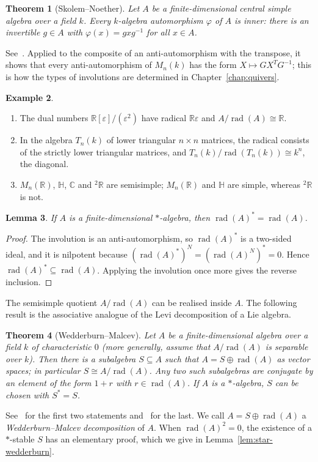 \documentclass[12pt, a4paper]{report}
\theoremstyle{plain}
\newtheorem{theorem}{Theorem}[chapter]
\newtheorem{lemma}[theorem]{Lemma}
\theoremstyle{definition}
\newtheorem{example}[theorem]{Example}
\theoremstyle{remark}
\theoremstyle{plain}
\newcommand{\rad}[0]{\operatorname{rad}} %
\newcommand{\RR}{\mathbb{R}}
\newcommand{\CC}{\mathbb{C}}
\newcommand{\HH}{\mathbb{H}}
\newcommand{\twoR}{{}^{2}\mathbb{R}}
\begin{document}
\begin{theorem}[Skolem--Noether]\label{thm:skolem-noether}
Let $A$ be a finite-dimensional central simple algebra over a field $k$. Every $k$-algebra automorphism $\varphi$ of $A$ is inner: there is an invertible $g\in A$ with $\varphi(x)=gxg^{-1}$ for all $x\in A$.
\end{theorem}
See~\cite{Jacobson1989,KMRT1998}. Applied to the composite of an anti-automorphism with the transpose, it shows that every anti-automorphism of $M_n(k)$ has the form $X\mapsto GX^TG^{-1}$; this is how the types of involutions are determined in Chapter~\ref{chap:quivers}.

\begin{example}\label{ex:radicals}
\begin{enumerate}
  \item The dual numbers $\RR[\varepsilon]/(\varepsilon^2)$ have radical $\RR\varepsilon$ and $A/\rad(A)\cong\RR$.
  \item In the algebra $T_n(k)$ of lower triangular $n\times n$ matrices, the radical consists of the strictly lower triangular matrices, and $T_n(k)/\rad(T_n(k))\cong k^n$, the diagonal.
  \item $M_n(\RR)$, $\HH$, $\CC$ and $\twoR$ are semisimple; $M_n(\RR)$ and $\HH$ are simple, whereas $\twoR$ is not.
\end{enumerate}
\end{example}

\begin{lemma}\label{lem:radical-stable}
If $A$ is a finite-dimensional $*$-algebra, then $\rad(A)^*=\rad(A)$.
\end{lemma}
\begin{proof}
The involution is an anti-automorphism, so $\rad(A)^*$ is a two-sided ideal, and it is nilpotent because $(\rad(A)^*)^N=(\rad(A)^N)^*=0$. Hence $\rad(A)^*\subseteq\rad(A)$. Applying the involution once more gives the reverse inclusion.
\end{proof}

The semisimple quotient $A/\rad(A)$ can be realised inside $A$. The following result is the associative analogue of the Levi decomposition of a Lie algebra.

\begin{theorem}[Wedderburn--Malcev]\label{thm:wedderburn-malcev}
Let $A$ be a finite-dimensional algebra over a field $k$ of characteristic $0$ (more generally, assume that $A/\rad(A)$ is separable over $k$). Then there is a subalgebra $S\subseteq A$ such that $A=S\oplus\rad(A)$ as vector spaces; in particular $S\cong A/\rad(A)$. Any two such subalgebras are conjugate by an element of the form $1+r$ with $r\in\rad(A)$. If $A$ is a $*$-algebra, $S$ can be chosen with $S^*=S$.
\end{theorem}
See~\cite[\S11.6]{Pierce1982} for the first two statements and~\cite{Taft1957} for the last. We call $A=S\oplus\rad(A)$ a \emph{Wedderburn--Malcev decomposition} of $A$. When $\rad(A)^2=0$, the existence of a $*$-stable $S$ has an elementary proof, which we give in Lemma~\ref{lem:star-wedderburn}.
\end{document}
